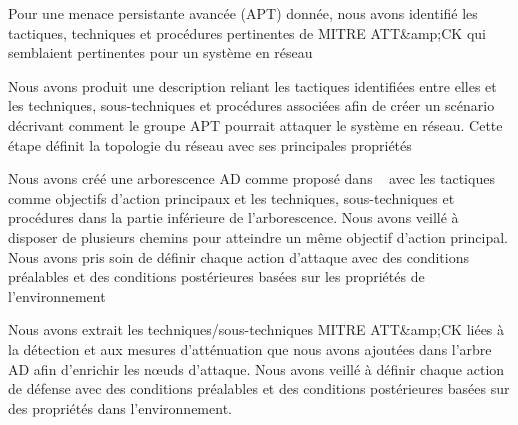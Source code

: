 \begin{enumerate*}[label=\arabic*),itemjoin={;\quad}]

    \item Pour une menace persistante avancée (APT) donnée, nous avons identifié les tactiques, techniques et procédures pertinentes de MITRE ATT\&amp;CK qui semblaient pertinentes pour un système en réseau


    
    \item Nous avons produit une description reliant les tactiques identifiées entre elles et les techniques, sous-techniques et procédures associées afin de créer un scénario décrivant comment le groupe APT pourrait attaquer le système en réseau. Cette étape définit la topologie du réseau avec ses principales propriétés

    \item Nous avons créé une arborescence AD comme proposé dans ~\cite{BKordy2010} avec les tactiques comme objectifs d'action principaux et les techniques, sous-techniques et procédures dans la partie inférieure de l'arborescence. Nous avons veillé à disposer de plusieurs chemins pour atteindre un même objectif d'action principal. Nous avons pris soin de définir chaque action d'attaque avec des conditions préalables et des conditions postérieures basées sur les propriétés de l'environnement

    \item Nous avons extrait les techniques/sous-techniques MITRE ATT\&amp;CK liées à la détection et aux mesures d'atténuation que nous avons ajoutées dans l'arbre AD afin d'enrichir les nœuds d'attaque. Nous avons veillé à définir chaque action de défense avec des conditions préalables et des conditions postérieures basées sur des propriétés dans l'environnement.




\end{enumerate*}
